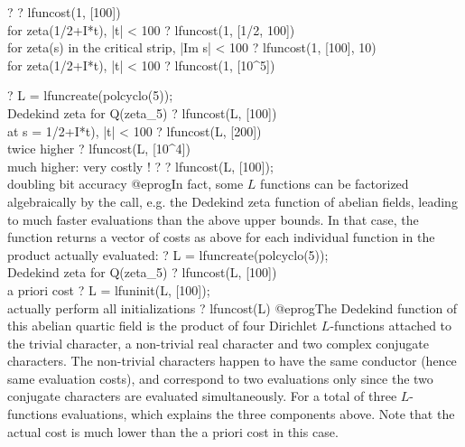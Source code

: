 \bprog
? 
? lfuncost(1, [100]) \\ for zeta(1/2+I*t), |t| < 100
? lfuncost(1, [1/2, 100]) \\ for zeta(s) in the critical strip, |Im s| < 100
? lfuncost(1, [100], 10) \\ for zeta(1/2+I*t), |t| < 100
? lfuncost(1, [10^5])

? L = lfuncreate(polcyclo(5)); \\ Dedekind zeta for Q(zeta_5)
? lfuncost(L, [100]) \\ at s = 1/2+I*t), |t| < 100
? lfuncost(L, [200]) \\ twice higher
? lfuncost(L, [10^4])  \\ much higher: very costly !
? 
? lfuncost(L, [100]); \\ doubling bit accuracy
@eprog\noindent In fact, some $L$ functions can be factorized algebraically
by the  call, e.g. the Dedekind zeta function of abelian
fields, leading to much faster evaluations than the above upper bounds.
In that case, the function returns a vector of costs as above for each
individual function in the product actually evaluated:
\bprog
? L = lfuncreate(polcyclo(5)); \\ Dedekind zeta for Q(zeta_5)
? lfuncost(L, [100])  \\ a priori cost
? L = lfuninit(L, [100]); \\ actually perform all initializations
? lfuncost(L)
@eprog\noindent The Dedekind function of this abelian quartic field
is the product of four Dirichlet $L$-functions attached to the trivial
character, a non-trivial real character and two complex conjugate
characters. The non-trivial characters happen to have the same conductor
(hence same evaluation costs), and correspond to two evaluations only
since the two conjugate characters are evaluated simultaneously.
For a total of three $L$-functions evaluations, which explains the three
components above. Note that the actual cost is much lower than the a priori
cost in this case.

